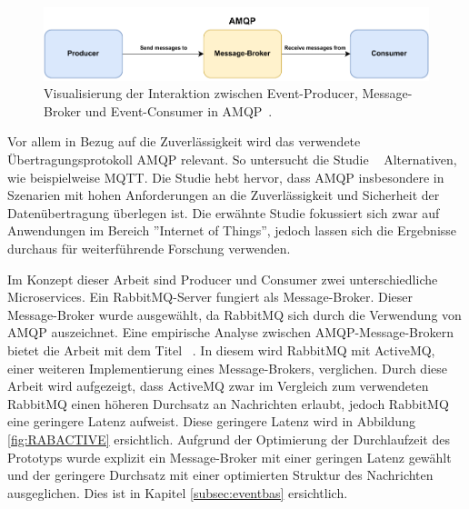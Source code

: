 \begin{figure}[H]
    \centering
    \includegraphics[width=14.5cm]{images/40_concept/AMQP.drawio.pdf}
    \caption[Visualisierung \acl{AMQP} Teilnehmer]{Visualisierung der Interaktion zwischen Event-Producer, Message-Broker und Event-Consumer in \ac{AMQP}~\parencite[vgl.][]{vitale}.}
    \label{fig:amqp}
\end{figure}
 Vor allem in Bezug auf die Zuverlässigkeit wird das verwendete Übertragungsprotokoll \ac{AMQP} relevant. So untersucht die Studie \textit{~\parencite[vgl.][]{9023812}{}{}} Alternativen, wie beispielweise \ac{MQTT}. Die Studie hebt hervor, dass \ac{AMQP} insbesondere in Szenarien mit hohen Anforderungen an die Zuverlässigkeit und Sicherheit der Datenübertragung überlegen ist. Die erwähnte Studie fokussiert sich zwar auf Anwendungen im Bereich ''Internet of Things'', jedoch lassen sich die Ergebnisse durchaus für weiterführende Forschung verwenden.

  Im Konzept dieser Arbeit sind Producer und Consumer zwei unterschiedliche Microservices. Ein RabbitMQ-Server fungiert als Message-Broker. Dieser Message-Broker wurde ausgewählt, da RabbitMQ sich durch die Verwendung von \ac{AMQP} auszeichnet. Eine empirische Analyse zwischen \ac{AMQP}-Message-Brokern bietet die Arbeit mit dem Titel ~\parencite[vgl.][]{9615705}{}{}. In diesem wird RabbitMQ mit ActiveMQ, einer weiteren Implementierung eines Message-Brokers, verglichen. Durch diese Arbeit wird aufgezeigt, dass ActiveMQ zwar im Vergleich zum verwendeten RabbitMQ einen höheren Durchsatz an Nachrichten erlaubt, jedoch RabbitMQ eine geringere Latenz aufweist. Diese geringere Latenz wird in Abbildung \ref{fig:RABACTIVE} ersichtlich. Aufgrund der Optimierung der Durchlaufzeit des Prototyps wurde explizit ein Message-Broker mit einer geringen Latenz gewählt und der geringere Durchsatz mit einer optimierten Struktur des Nachrichten ausgeglichen. Dies ist in Kapitel \ref{subsec:eventbas} ersichtlich.

